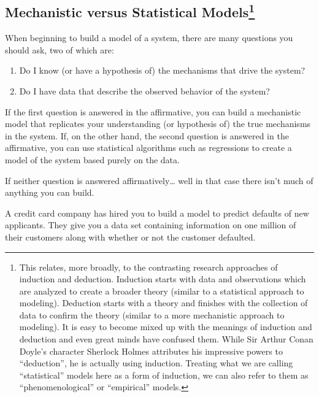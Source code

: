 \documentclass[]{memoir}
\begin{document}
\subsection[Mechanistic versus Statistical Models]{Mechanistic versus
Statistical Models\footnote{This relates, more broadly, to the
  contrasting research approaches of induction and deduction. Induction
  starts with data and observations which are analyzed to create a
  broader theory (similar to a statistical approach to modeling).
  Deduction starts with a theory and finishes with the collection of
  data to confirm the theory (similar to a more mechanistic approach to
  modeling). It is easy to become mixed up with the meanings of
  induction and deduction and even great minds have confused them. While
  Sir Arthur Conan Doyle's character Sherlock Holmes attributes his
  impressive powers to ``deduction'', he is actually using induction.
  Treating what we are calling ``statistical'' models here as a form of
  induction, we can also refer to them as ``phenomenological'' or
  ``empirical'' models.}}

When beginning to build a model of a system, there are many questions
you should ask, two of which are:

\begin{enumerate}
\def\labelenumi{\arabic{enumi}.}
\itemsep1pt\parskip0pt
\item
  Do I know (or have a hypothesis of) the mechanisms that drive the
  system?
\item
  Do I have data that describe the observed behavior of the system?
\end{enumerate}

If the first question is answered in the affirmative, you can build a
mechanistic model that replicates your understanding (or hypothesis of)
the true mechanisms in the system. If, on the other hand, the second
question is answered in the affirmative, you can use statistical
algorithms such as regressions to create a model of the system based
purely on the data.

If neither question is answered affirmatively\ldots{} well in that case
there isn't much of anything you can build.


A credit card company has hired you to build a model to predict defaults
of new applicants. They give you a data set containing information on
one million of their customers along with whether or not the customer
defaulted.
\end{document}
